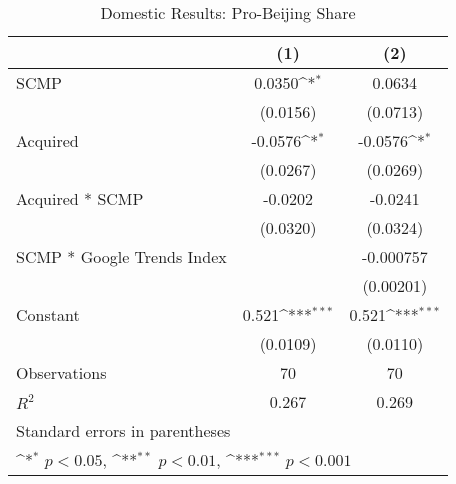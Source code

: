 \begin{table}[htbp]\centering
\def\sym#1{\ifmmode^{#1}\else\(^{#1}\)\fi}
\caption{Domestic Results: Pro-Beijing Share\label{pbdomestic}}
\begin{tabular*}{0.75\textwidth}{@{\hskip\tabcolsep\extracolsep\fill}l*{2}{c}}
\hline\hline
                &\multicolumn{1}{c}{(1)}         &\multicolumn{1}{c}{(2)}         \\
\hline
SCMP            &   0.0350\sym{*}  &   0.0634         \\
                & (0.0156)         & (0.0713)         \\
[1em]
Acquired        &  -0.0576\sym{*}  &  -0.0576\sym{*}  \\
                & (0.0267)         & (0.0269)         \\
[1em]
Acquired * SCMP &  -0.0202         &  -0.0241         \\
                & (0.0320)         & (0.0324)         \\
[1em]
SCMP * Google Trends Index&                  &-0.000757         \\
                &                  &(0.00201)         \\
[1em]
Constant        &    0.521\sym{***}&    0.521\sym{***}\\
                & (0.0109)         & (0.0110)         \\
\hline
Observations    &       70         &       70         \\
\(R^{2}\)       &    0.267         &    0.269         \\
\hline\hline
\multicolumn{3}{l}{\footnotesize Standard errors in parentheses}\\
\multicolumn{3}{l}{\footnotesize \sym{*} \(p<0.05\), \sym{**} \(p<0.01\), \sym{***} \(p<0.001\)}\\
\end{tabular*}
\end{table}
